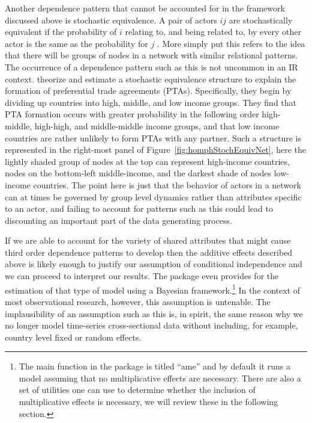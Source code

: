 Another dependence pattern that cannot be accounted for in the framework discussed above is stochastic equivalence. A pair of actors $ij$ are stochastically equivalent if the probability of $i$ relating to, and being related to, by every other actor is the same as the probability for $j$ \citep{anderson:etal:1992}. More simply put this refers to the idea that there will be groups of nodes in a network with similar relational patterns. The occurrence of a dependence pattern such as this is not uncommon in an IR context. \citet{manger:etal:2012} theorize and estimate a stochastic equivalence structure to explain the formation of preferential trade agreements (PTAs). Specifically, they begin by dividing up countries into high, middle, and low income groups. They find that PTA formation occurs with greater probability in the following order high-middle, high-high, and middle-middle income groups, and that low income countries are rather unlikely to form PTAs with any partner. Such a structure is represented in the right-most panel of Figure~\ref{fig:homphStochEquivNet}, here the lightly shaded group of nodes at the top can represent high-income countries, nodes on the bottom-left middle-income, and the darkest shade of nodes low-income countries. The point here is just that the behavior of actors in a network can at times be governed by group level dynamics rather than attributes specific to an actor, and failing to account for patterns such as this could lead to discounting an important part of the data generating process. 

If we are able to account for the variety of shared attributes that might cause third order dependence patterns to develop then the additive effects described above is likely enough to justify our assumption of conditional independence and we can proceed to interpret our results. The  package even provides for the estimation of that type of model using a Bayesian framework.\footnote{The main function in the  package is titled ``ame'' and by default it runs a model assuming that no multiplicative effects are necessary. There are also a set of utilities one can use to determine whether the inclusion of multiplicative effects is necessary, we will review these in the following section.} In the context of most observational research, however, this assumption is untenable. The implausibility of an assumption such as this is, in spirit, the same reason why we no longer model time-series cross-sectional data without including, for example, country level fixed or random effects.

